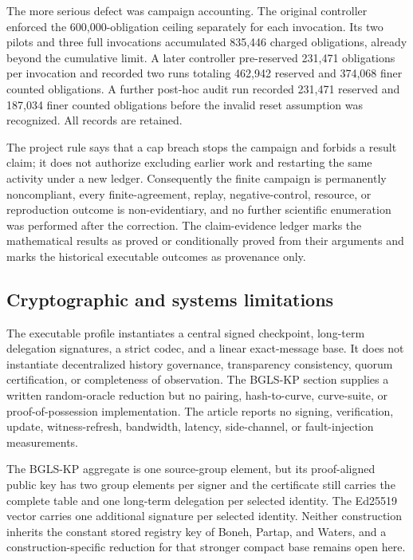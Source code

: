\documentclass[11pt]{article}
\theoremstyle{definition}
\begin{document}
The more serious defect was campaign accounting.  The original controller enforced the 600,000-obligation ceiling separately for each invocation.  Its two pilots and three full invocations accumulated 835,446 charged obligations, already beyond the cumulative limit.  A later controller pre-reserved 231,471 obligations per invocation and recorded two runs totaling 462,942 reserved and 374,068 finer counted obligations.  A further post-hoc audit run recorded 231,471 reserved and 187,034 finer counted obligations before the invalid reset assumption was recognized.  All records are retained.

The project rule says that a cap breach stops the campaign and forbids a result claim; it does not authorize excluding earlier work and restarting the same activity under a new ledger.  Consequently the finite campaign is permanently noncompliant, every finite-agreement, replay, negative-control, resource, or reproduction outcome is non-evidentiary, and no further scientific enumeration was performed after the correction.  The claim-evidence ledger marks the mathematical results as proved or conditionally proved from their arguments and marks the historical executable outcomes as provenance only.

\subsection{Cryptographic and systems limitations}
The executable profile instantiates a central signed checkpoint, long-term delegation signatures, a strict codec, and a linear exact-message base.  It does not instantiate decentralized history governance, transparency consistency, quorum certification, or completeness of observation.  The BGLS-KP section supplies a written random-oracle reduction but no pairing, hash-to-curve, curve-suite, or proof-of-possession implementation.  The article reports no signing, verification, update, witness-refresh, bandwidth, latency, side-channel, or fault-injection measurements.

The BGLS-KP aggregate is one source-group element, but its proof-aligned public key has two group elements per signer and the certificate still carries the complete table and one long-term delegation per selected identity.  The Ed25519 vector carries one additional signature per selected identity.  Neither construction inherits the constant stored registry key of Boneh, Partap, and Waters, and a construction-specific reduction for that stronger compact base remains open here.
\end{document}
